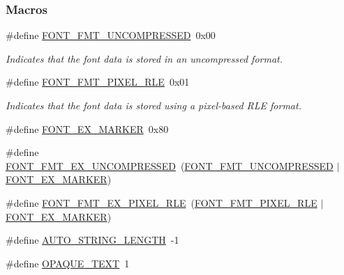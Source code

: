 \subsubsection*{Macros}
\begin{DoxyCompactItemize}
\item 
\#define \hyperlink{group__primitives__api_ga2a31fdac9b1c2fa434ae27fd819a4eec}{F\+O\+N\+T\+\_\+\+F\+M\+T\+\_\+\+U\+N\+C\+O\+M\+P\+R\+E\+S\+S\+E\+D}~0x00
\begin{DoxyCompactList}\small\item\em Indicates that the font data is stored in an uncompressed format. \end{DoxyCompactList}\item 
\#define \hyperlink{group__primitives__api_ga94fcc0b769073d918b5356b8e451185e}{F\+O\+N\+T\+\_\+\+F\+M\+T\+\_\+\+P\+I\+X\+E\+L\+\_\+\+R\+L\+E}~0x01
\begin{DoxyCompactList}\small\item\em Indicates that the font data is stored using a pixel-\/based R\+L\+E format. \end{DoxyCompactList}\item 
\#define \hyperlink{group__primitives__api_ga3d49714fe224dbaae723df08ac70341d}{F\+O\+N\+T\+\_\+\+E\+X\+\_\+\+M\+A\+R\+K\+E\+R}~0x80
\item 
\#define \hyperlink{group__primitives__api_ga918f13c1ee1bcab7fcc85dfded454dd9}{F\+O\+N\+T\+\_\+\+F\+M\+T\+\_\+\+E\+X\+\_\+\+U\+N\+C\+O\+M\+P\+R\+E\+S\+S\+E\+D}~(\hyperlink{group__primitives__api_ga2a31fdac9b1c2fa434ae27fd819a4eec}{F\+O\+N\+T\+\_\+\+F\+M\+T\+\_\+\+U\+N\+C\+O\+M\+P\+R\+E\+S\+S\+E\+D} $\vert$ \hyperlink{group__primitives__api_ga3d49714fe224dbaae723df08ac70341d}{F\+O\+N\+T\+\_\+\+E\+X\+\_\+\+M\+A\+R\+K\+E\+R})
\item 
\#define \hyperlink{group__primitives__api_ga4673322aefbfe3faf04fef282f91819d}{F\+O\+N\+T\+\_\+\+F\+M\+T\+\_\+\+E\+X\+\_\+\+P\+I\+X\+E\+L\+\_\+\+R\+L\+E}~(\hyperlink{group__primitives__api_ga94fcc0b769073d918b5356b8e451185e}{F\+O\+N\+T\+\_\+\+F\+M\+T\+\_\+\+P\+I\+X\+E\+L\+\_\+\+R\+L\+E} $\vert$ \hyperlink{group__primitives__api_ga3d49714fe224dbaae723df08ac70341d}{F\+O\+N\+T\+\_\+\+E\+X\+\_\+\+M\+A\+R\+K\+E\+R})
\item 
\#define \hyperlink{group__primitives__api_ga0ab84b39cc131f7bbe32789bcf55c6be}{A\+U\+T\+O\+\_\+\+S\+T\+R\+I\+N\+G\+\_\+\+L\+E\+N\+G\+T\+H}~-\/1
\item 
\#define \hyperlink{group__primitives__api_gafe835b969123997a980c6a8cf5e894ad}{O\+P\+A\+Q\+U\+E\+\_\+\+T\+E\+X\+T}~1

\end{DoxyCompactItemize}
